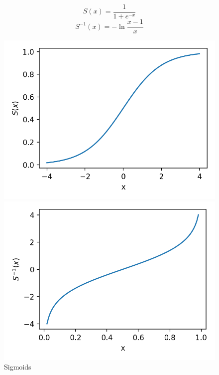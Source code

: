 \begin{equation}
  \label{eq:sigmoid}
  S(x) = \frac{1}{1+e^{-x}}
\end{equation}
\begin{equation}
  \label{eq:sigmoid_r}
  S^{-1}(x) = -\ln{\frac{x-1}{x}}
\end{equation}

\begin{figure}
  \centering
  \caption{Sigmoids}
  \label{fig:sigmoids}

  \label{fig:sigmoid}
  \includegraphics[width=\linewidth]{img/sigmoid.png}

  \label{fig:sigmoid_r}
  \includegraphics[width=\linewidth]{img/sigmoid_r.png}
\end{figure}

